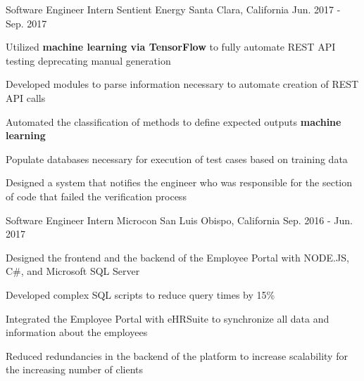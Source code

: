 


\begin{cventries}


\cventry
{Software Engineer Intern} %
{Sentient Energy} %
{Santa Clara, California} %
{Jun. 2017 - Sep. 2017} %
{ %
\begin{cvitems}
\item {Utilized \textbf{machine learning via TensorFlow} to fully automate REST API testing deprecating manual generation}
\item {Developed modules to parse information necessary to automate creation of REST API calls}
\item {Automated the classification of methods to define expected outputs \textbf{machine learning}}
\item {Populate databases necessary for execution of test cases based on training data}
\item {Designed a system that notifies the engineer who was responsible for the section of code that failed the verification process}
\end{cvitems}
}


\cventry
{Software Engineer Intern} %
{Microcon} %
{San Luis Obispo, California} %
{Sep. 2016 - Jun. 2017} %
{ %
\begin{cvitems}
\item {Designed the frontend and the backend of the Employee Portal with NODE.JS, C\#, and Microsoft SQL Server}
\item {Developed complex SQL scripts to reduce query times by 15\%}
\item {Integrated the Employee Portal with eHRSuite to synchronize all data and information about the employees}
\item {Reduced redundancies in the backend of the platform to increase scalability for the increasing number of clients}
\end{cvitems}
}


\end{cventries}
